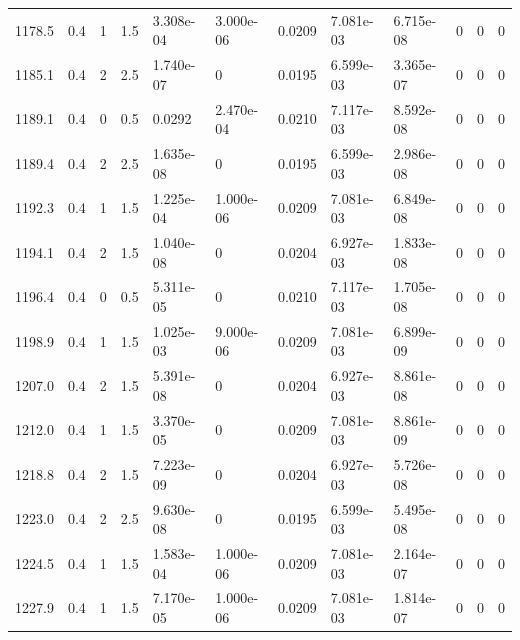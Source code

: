 \documentclass[preview]{standalone}
\begin{document}
{{{\begin{tabular}{L{1.2cm}C{1.2cm} C{0.3cm}C{0.5cm} C{1.4cm}C{1.4cm} C{1.4cm}C{1.4cm} C{1.6cm}C{1.6cm} C{1.6cm}C{1.6cm}}
  1178.5  &   0.4  & 1     & 1.5 &  3.308e-04  & 3.000e-06  &  0.0209&   7.081e-03& 6.715e-08 & 0   &  0 & 0  \\ 
  1185.1  &   0.4  & 2     & 2.5 &  1.740e-07  & 0  &  0.0195&   6.599e-03& 3.365e-07 & 0   &  0 & 0  \\ 
  1189.1  &   0.4  & 0     & 0.5 &  0.0292  & 2.470e-04  &  0.0210&   7.117e-03& 8.592e-08 & 0   &  0 & 0  \\ 
  1189.4  &   0.4  & 2     & 2.5 &  1.635e-08  & 0  &  0.0195&   6.599e-03& 2.986e-08 & 0   &  0 & 0  \\ 
  1192.3  &   0.4  & 1     & 1.5 &  1.225e-04  & 1.000e-06  &  0.0209&   7.081e-03& 6.849e-08 & 0   &  0 & 0  \\ 
  1194.1  &   0.4  & 2     & 1.5 &  1.040e-08  & 0  &  0.0204&   6.927e-03& 1.833e-08 & 0   &  0 & 0  \\ 
  1196.4  &   0.4  & 0     & 0.5 &  5.311e-05  & 0  &  0.0210&   7.117e-03& 1.705e-08 & 0   &  0 & 0  \\ 
  1198.9  &   0.4  & 1     & 1.5 &  1.025e-03  & 9.000e-06  &  0.0209&   7.081e-03& 6.899e-09 & 0   &  0 & 0  \\ 
  1207.0  &   0.4  & 2     & 1.5 &  5.391e-08  & 0  &  0.0204&   6.927e-03& 8.861e-08 & 0   &  0 & 0  \\ 
  1212.0  &   0.4  & 1     & 1.5 &  3.370e-05  & 0  &  0.0209&   7.081e-03& 8.861e-09 & 0   &  0 & 0  \\ 
  1218.8  &   0.4  & 2     & 1.5 &  7.223e-09  & 0  &  0.0204&   6.927e-03& 5.726e-08 & 0   &  0 & 0  \\ 
  1223.0  &   0.4  & 2     & 2.5 &  9.630e-08  & 0  &  0.0195&   6.599e-03& 5.495e-08 & 0   &  0 & 0  \\ 
  1224.5  &   0.4  & 1     & 1.5 &  1.583e-04  & 1.000e-06  &  0.0209&   7.081e-03& 2.164e-07 & 0   &  0 & 0  \\ 
  1227.9  &   0.4  & 1     & 1.5 &  7.170e-05  & 1.000e-06  &  0.0209&   7.081e-03& 1.814e-07 & 0   &  0 & 0  \\ 
\hline 
\end{tabular} 

}}}
\end{document}
